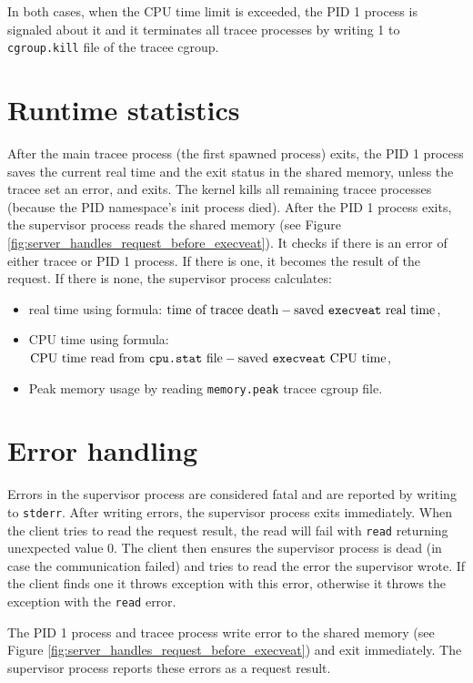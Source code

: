 \documentclass[en]{pracamgr}
\begin{document}
In both cases, when the CPU time limit is exceeded, the PID 1 process is signaled about it and it terminates all tracee processes by writing 1 to \texttt{cgroup.kill} file of the tracee cgroup.

\section{Runtime statistics}

After the main tracee process (the first spawned process) exits, the PID 1 process saves the current real time and the exit status in the shared memory, unless the tracee set an error, and exits. The kernel kills all remaining tracee processes (because the PID namespace's init process died). After the PID 1 process exits, the supervisor process reads the shared memory (see Figure \ref{fig:server_handles_request_before_execveat}). It checks if there is an error of either tracee or PID 1 process. If there is one, it becomes the result of the request. If there is none, the supervisor process calculates:
\begin{itemize}
    \item real time using formula: $\text{time of tracee death} - \text{saved \texttt{execveat} real time}$,
    \item CPU time using formula: $\text{CPU time read from \texttt{cpu.stat} file} - \text{saved \texttt{execveat} CPU time}$,
    \item Peak memory usage by reading \texttt{memory.peak} tracee cgroup file.
\end{itemize}

\section{Error handling}

Errors in the supervisor process are considered fatal and are reported by writing to \texttt{stderr}. After writing errors, the supervisor process exits immediately. When the client tries to read the request result, the read will fail with \texttt{read} returning unexpected value 0. The client then ensures the supervisor process is dead (in case the communication failed) and tries to read the error the supervisor wrote. If the client finds one it throws exception with this error, otherwise it throws the exception with the \texttt{read} error.

The PID 1 process and tracee process write error to the shared memory (see Figure \ref{fig:server_handles_request_before_execveat}) and exit immediately. The supervisor process reports these errors as a request result.
\end{document}
